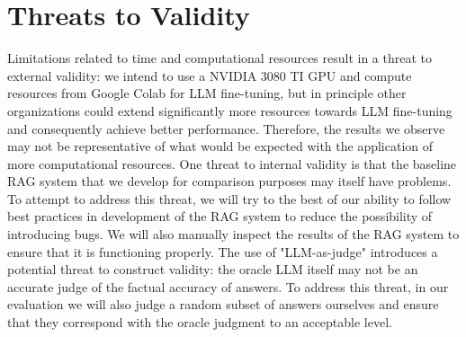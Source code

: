 \section{Threats to Validity}

Limitations related to time and computational resources result in a threat to external validity: we intend to use a NVIDIA 3080 TI GPU and compute resources from Google Colab for LLM fine-tuning, but in principle other organizations could extend significantly more resources towards LLM fine-tuning and consequently achieve better performance. Therefore, the results we observe may not be representative of what would be expected with the application of more computational resources.
One threat to internal validity is that the baseline RAG system that we develop for comparison purposes may itself have problems. To attempt to address this threat, we will try to the best of our ability to follow best practices in development of the RAG system to reduce the possibility of introducing bugs. We will also manually inspect the results of the RAG system to ensure that it is functioning properly.
The use of "LLM-as-judge" introduces a potential threat to construct validity: the oracle LLM itself may not be an accurate judge of the factual accuracy of answers. To address this threat, in our evaluation we will also judge a random subset of answers ourselves and ensure that they correspond with the oracle judgment to an acceptable level.
